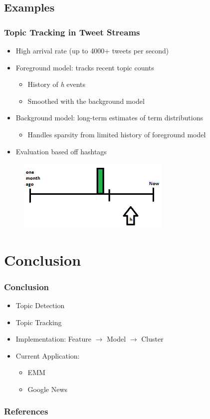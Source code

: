\documentclass{beamer}
\begin{document}
\subsection{Examples}
\begin{frame}
	\frametitle{Topic Tracking in Tweet Streams \citep{Lin:2011:STA:2020408.2020476}}
	\begin{itemize}
		\item High arrival rate (up to 4000+ tweets per second)
		\item Foreground model: tracks recent topic counts
			\begin{itemize}
				\item History of \emph{h} events
				\item Smoothed with the background model
			\end{itemize}
		\item Background model: long-term estimates of term distributions
			\begin{itemize}
				\item Handles sparsity from limited history of foreground model
			\end{itemize}
		\item Evaluation based off hashtags
	\end{itemize}
\begin{figure}[hb]
\centering
\includegraphics[width=0.65\textwidth]{images/twitter}
\end{figure}
\end{frame}

\section{Conclusion}
\begin{frame}
	\frametitle{Conclusion}
	\begin{itemize}
		\item Topic Detection
		\item Topic Tracking
		\item Implementation: Feature $\rightarrow$ Model $\rightarrow$ Cluster
		\item Current Application:
			\begin{itemize}
				\item EMM
				\item Google News
			\end{itemize}
	\end{itemize}
\end{frame}

\begin{frame}
  \frametitle{References}
  \scriptsize{
    
    
  }

\end{frame}
\end{document}

